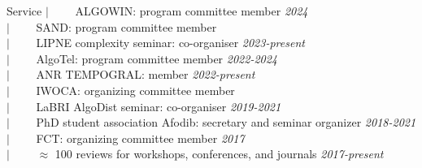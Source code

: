 \documentclass[french]{resume} %
\begin{document}
	\begin{rSection}{Service} %
		$| \qquad$ ALGOWIN: program committee member \hfill {\em 2024} \\
		$| \qquad$ SAND: program committee member \\
		$| \qquad$ LIPNE complexity seminar: co-organiser \hfill {\em 2023-present}\\
		$| \qquad$ AlgoTel: program committee member \hfill {\em 2022-2024} \\
		$| \qquad$ ANR TEMPOGRAL: member \hfill {\em 2022-present} \\
		$| \qquad$ IWOCA: organizing committee member \\
		$| \qquad$ LaBRI AlgoDist seminar: co-organiser \hfill {\em 2019-2021}\\
		$| \qquad$ PhD student association Afodib: secretary and seminar organizer \hfill {\em 2018-2021}\\
		$| \qquad$ FCT: organizing committee member \hfill {\em 2017}\\
		$| \qquad$ $\approx$ 100 reviews for workshops, conferences, and journals \hfill {\em 2017-present}\\
	\end{rSection}
\end{document}

